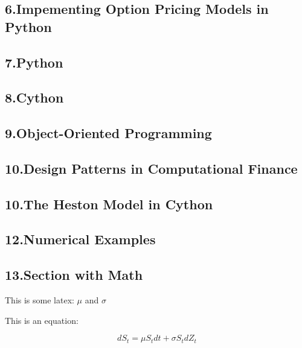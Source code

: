 \documentclass[11pt,]{article}
\begin{document}
\subsection{6.Impementing Option Pricing Models in
Python}\label{impementing-option-pricing-models-in-python}

\subsection{7.Python}\label{python}

\subsection{8.Cython}\label{cython}

\subsection{9.Object-Oriented
Programming}\label{object-oriented-programming}

\subsection{10.Design Patterns in Computational
Finance}\label{design-patterns-in-computational-finance}

\subsection{10.The Heston Model in
Cython}\label{the-heston-model-in-cython}

\subsection{12.Numerical Examples}\label{numerical-examples}

\subsection{13.Section with Math}\label{section-with-math}

This is some latex: \(\mu\) and \(\sigma\)

This is an equation:

\[
dS_{t} = \mu S_{t} dt + \sigma S_{t} dZ_{t}
\]

\newpage
\singlespacing 

\end{document}
